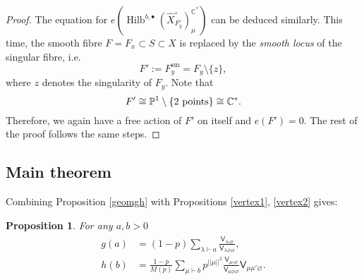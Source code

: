 \documentclass{amsart}
\newtheorem{proposition}[theorem]{Proposition}
\theoremstyle{definition}
\newcommand{\CC} {\mathbb{C}}          %
\newcommand{\PP} {\mathbb{P}}
\newcommand{\sfV}{\mathsf{V}}
\newcommand{\Hilb}{\operatorname{Hilb}}
\newcommand{\sm}{\operatorname{sm}}
\newcommand{\Xhat}{\widehat{X}}
\begin{document}
\begin{proof}
The equation for $e(\Hilb^{b,\bullet}(\Xhat ^{\circ}_{F_{y}^{\circ}})_{\mu}^{\CC^*})$ can be deduced similarly. This time, the smooth fibre $F = F_x \subset S \subset X$ is replaced by the \emph{smooth locus} of the singular fibre, i.e.~ 
$$
F' := F_{y}^{\sm} = F_{y} \setminus \{z\},
$$
where $z$ denotes the singularity of $F_y$. Note that
$$
F' \cong \PP^1 \setminus \{2 \ \rm{points}\} \cong \CC^*.
$$
Therefore, we again have a free action of $F'$ on itself and $e(F') = 0$. The rest of the proof follows the same steps.
\end{proof}   


\subsection{Main theorem}

Combining Proposition \ref{geomgh} with Propositions \ref{vertex1}, \ref{vertex2} gives:
\begin{proposition} \label{combgh}
For any $a,b>0$ 
\begin{align}
\begin{split} \label{gh}
g(a) &= (1-p) \sum_{\lambda \vdash a} \frac{\sfV_{\lambda\square\varnothing}}{\sfV_{\lambda\varnothing\varnothing}}, \\
h(b) &= \frac{1-p}{M(p)} \sum_{\mu \vdash b} p^{|\!|\mu|\!|^2} \frac{\sfV_{\mu\square\varnothing}}{\sfV_{\mu\varnothing\varnothing}} \sfV_{\mu\mu'\varnothing}.
\end{split}
\end{align}
\end{proposition}
\end{document}
